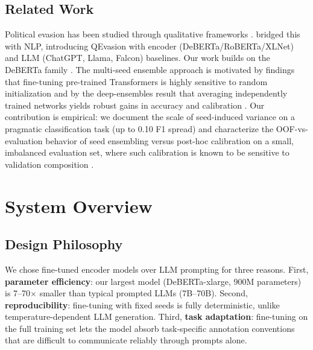 \documentclass[11pt]{article}
\begin{document}
\subsection{Related Work}

Political evasion has been studied through qualitative frameworks \citep{bull2003microanalysis, harris1991evasive, clayman2001answers}. \citet{thomas2024clarity} bridged this with NLP, introducing QEvasion with encoder (DeBERTa/RoBERTa/XLNet) and LLM (ChatGPT, Llama, Falcon) baselines. Our work builds on the DeBERTa family \citep{he2021deberta, he2023debertav3}. The multi-seed ensemble approach is motivated by findings that fine-tuning pre-trained Transformers is highly sensitive to random initialization \citep{dodge2020finetuning, mosbach2021stability} and by the deep-ensembles result that averaging independently trained networks yields robust gains in accuracy and calibration \citep{lakshminarayanan2017ensembles}. Our contribution is empirical: we document the scale of seed-induced variance on a pragmatic classification task (up to 0.10 F1 spread) and characterize the OOF-vs-evaluation behavior of seed ensembling versus post-hoc calibration on a small, imbalanced evaluation set, where such calibration is known to be sensitive to validation composition \citep{guo2017calibration}.

\section{System Overview}

\subsection{Design Philosophy}

We chose fine-tuned encoder models over LLM prompting for three reasons. First, \textbf{parameter efficiency}: our largest model (DeBERTa-xlarge, 900M parameters) is 7--70$\times$ smaller than typical prompted LLMs (7B--70B). Second, \textbf{reproducibility}: fine-tuning with fixed seeds is fully deterministic, unlike temperature-dependent LLM generation. Third, \textbf{task adaptation}: fine-tuning on the full training set lets the model absorb task-specific annotation conventions that are difficult to communicate reliably through prompts alone.
\end{document}
